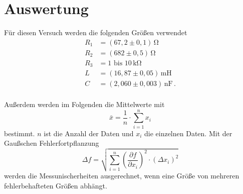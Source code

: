 
\nocite{anleitungV354}
\section{Auswertung}
\label{sec:Auswertung}
Für diesen Versuch werden die folgenden Größen verwendet
 \begin{align*}
    R_1 &= (67,2 \pm 0,1) \, \unit{\ohm} \\
    R_2 &= (682 \pm 0,5) \, \unit{\ohm} \\
    R_3 &= 1 \text{ bis } 10 \, \unit{\kilo\ohm} \\
    L &= (16,87 \pm 0,05) \, \unit{\milli\henry} \\
    C &= (2,060 \pm 0,003) \, \unit{\nano\farad}\,.
\end{align*}
\\
Außerdem werden im Folgenden die Mittelwerte mit 
$$\bar{x} = \frac{1}{n} \cdot \sum_{i = 1}^{n}x_i$$ bestimmt. $n$ ist die Anzahl der Daten und $x_i$ die einzelnen Daten.
Mit der Gaußschen Fehlerfortpflanzung
$$\Delta f = \sqrt{\sum_{i = 1}^{n} \left( \frac{\partial f}{\partial x_i} \right)^2 \cdot \left(\Delta x_i \right)^2}$$
werden die Messunischerheiten ausgerechnet, wenn eine Größe von mehreren fehlerbehafteten Größen abhängt.
